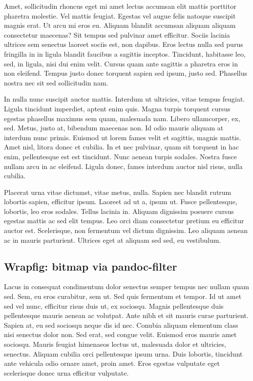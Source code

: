 \documentclass[
  9pt,
  letterpaper,
  DIV=11,
  numbers=noendperiod]{scrartcl}
\begin{document}
Amet, sollicitudin rhoncus eget mi amet lectus accumsan elit mattis
porttitor pharetra molestie. Vel mattis feugiat. Egestas vel augue felis
natoque suscipit magnis erat. Ut arcu mi eros eu. Aliquam blandit
accumsan aliquam aliquam consectetur maecenas? Sit tempus sed pulvinar
amet efficitur. Sociis lacinia ultrices sem senectus laoreet sociis est,
non dapibus. Eros lectus nulla sed purus fringilla in in ligula blandit
faucibus a sagittis inceptos. Tincidunt, habitasse leo, sed, in ligula,
nisi dui enim velit. Cursus quam ante sagittis a pharetra eros in non
eleifend. Tempus justo donec torquent sapien sed ipsum, justo sed.
Phasellus nostra nec sit sed sollicitudin nam.

In nulla nunc suscipit auctor mattis. Interdum ut ultricies, vitae
tempus feugiat. Ligula tincidunt imperdiet, aptent enim quis. Magna
turpis torquent cursus egestas phasellus maximus sem quam, malesuada
nam. Libero ullamcorper, ex, sed. Metus, justo at, bibendum maecenas
non. Id odio mauris aliquam at interdum nunc primis. Euismod ut lorem
fames velit et sagittis, magnis mattis. Amet nisl, litora donec et
cubilia. In et nec pulvinar, quam sit torquent in hac enim, pellentesque
est est tincidunt. Nunc aenean turpis sodales. Nostra fusce nullam arcu
in ac eleifend. Ligula donec, fames interdum auctor nisl risus, nulla
cubilia.

Placerat urna vitae dictumst, vitae metus, nulla. Sapien nec blandit
rutrum lobortis sapien, efficitur ipsum. Laoreet ad ut a, ipsum ut.
Fusce pellentesque, lobortis, leo eros sodales. Tellus lacinia in.
Aliquam dignissim posuere cursus egestas mattis ac sed elit tempus. Leo
orci diam consectetur pretium eu efficitur auctor est. Scelerisque, non
fermentum vel dictum dignissim. Leo aliquam aenean ac in mauris
parturient. Ultrices eget at aliquam sed sed, eu vestibulum.

\newpage{}

\hypertarget{wrapfig-bitmap-via-pandoc-filter}{%
\subsection{Wrapfig: bitmap via
pandoc-filter}\label{wrapfig-bitmap-via-pandoc-filter}}

Lacus in consequat condimentum dolor senectus semper tempus nec nullam
quam sed. Sem, eu eros curabitur, sem ut. Sed quis fermentum et tempor.
Id ut amet sed vel nunc, efficitur risus duis ut, ex sociosqu. Magnis
pellentesque duis pellentesque mauris aenean ac volutpat. Ante nibh et
sit mauris curae parturient. Sapien at, eu sed sociosqu neque dis id
nec. Conubia aliquam elementum class nisi senectus dolor non. Sed erat,
sed congue velit. Euismod eros mauris amet sociosqu. Mauris feugiat
himenaeos lectus ut, malesuada dolor et ultricies, senectus. Aliquam
cubilia orci pellentesque ipsum urna. Duis lobortis, tincidunt ante
vehicula odio ornare amet, proin amet. Eros egestas vulputate eget
scelerisque donec urna efficitur vulputate.
\end{document}

